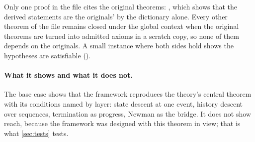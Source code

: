 Only one proof in the file cites the original theorems: , which shows
that the derived statements are the originals' by the dictionary alone. Every other theorem of the file
remains closed under the global context when the original theorems are turned into admitted axioms in
a scratch copy, so none of them depends on the originals. A small instance where both sides hold shows
the hypotheses are satisfiable ().

\paragraph{What it shows and what it does not.}
The base case shows that the framework reproduces the theory's central theorem with its conditions
named by layer: state descent at one event, history descent over sequences, termination as progress,
Newman as the bridge. It does not show reach, because the framework was designed with this theorem in
view; that is what \cref{sec:tests} tests.

